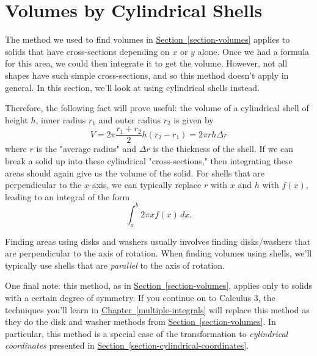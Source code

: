 \documentclass[10pt,]{book}
\theoremstyle{ptxplainnotitle}
\theoremstyle{ptxplaintitle}
\theoremstyle{ptxplainnotitle}
\theoremstyle{ptxplaintitle}
\theoremstyle{ptxplainnotitle}
\theoremstyle{ptxplaintitle}
\theoremstyle{ptxdefinitionnotitle}
\theoremstyle{ptxdefinitiontitle}
\theoremstyle{ptxdefinitionnotitle}
\theoremstyle{ptxdefinitiontitle}
\theoremstyle{ptxdefinitionnotitle}
\theoremstyle{ptxdefinitiontitle}
\theoremstyle{ptxdefinitionnotitle}
\theoremstyle{ptxdefinitiontitle}
\theoremstyle{ptxdefinitionnotitle}
\theoremstyle{ptxdefinitiontitle}
\numberwithin{equation}{section}
\begin{document}
\section[{Volumes by Cylindrical Shells}]{Volumes by Cylindrical Shells}\label{section-volumes-by-cylindrical-shells}
\hypertarget{p-638}{}%
The method we used to find volumes in \hyperref[section-volumes]{Section~\ref{section-volumes}} applies to solids that have cross-sections depending on \(x\) or \(y\) alone. Once we had a formula for this area, we could then integrate it to get the volume. However, not all shapes have such simple cross-sections, and so this method doesn't apply in general. In this section, we'll look at using cylindrical shells instead.%
\par
\hypertarget{p-639}{}%
Therefore, the following fact will prove useful: the volume of a cylindrical shell of height \(h\), inner radius \(r_{1}\) and outer radius \(r_{2}\) is given by%
\begin{equation}
V = 2\pi\frac{r_{1} + r_{2}}{2}h(r_{2} - r_{1}) = 2\pi rh\Delta r\label{equation-volume-cylindrical-shell}
\end{equation}
where \(r\) is the "average radius" and \(\Delta r\) is the thickness of the shell. If we can break a solid up into these cylindrical "cross-sections," then integrating these areas should again give us the volume of the solid. For shells that are perpendicular to the \(x\)-axis, we can typically replace \(r\) with \(x\) and \(h\) with \(f(x)\), leading to an integral of the form%
\begin{equation*}
\int_{a}^{b}2\pi xf(x)\,dx.
\end{equation*}
\begin{aside}{}\label{aside-11}
\hypertarget{p-640}{}%
Finding areas using disks and washers usually involves finding disks/washers that are perpendicular to the axis of rotation. When finding volumes using shells, we'll typically use shells that are \emph{parallel} to the axis of rotation.%
\end{aside}
%
\par
\hypertarget{p-641}{}%
One final note: this method, as in \hyperref[section-volumes]{Section~\ref{section-volumes}}, applies only to solids with a certain degree of symmetry. If you continue on to Calculus 3, the techniques you'll learn in \hyperref[multiple-integrals]{Chapter~\ref{multiple-integrals}} will replace this method as they do the disk and washer methods from \hyperref[section-volumes]{Section~\ref{section-volumes}}. In particular, this method is a special case of the transformation to \emph{cylindrical coordinates} presented in \hyperref[section-cylindrical-coordinates]{Section~\ref{section-cylindrical-coordinates}}.%
\end{document}
